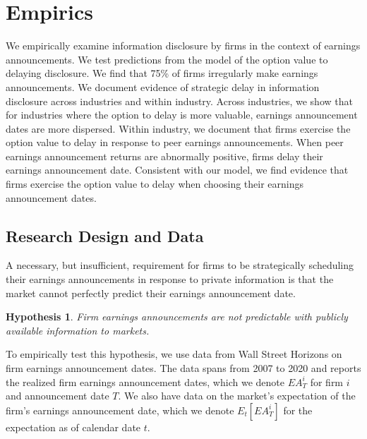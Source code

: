 \documentclass[ecta,nameyear,draft]{econsocart}
\theoremstyle{theorem}
\newtheorem{hypothesis}{Hypothesis}
\numberwithin{lemma}{section}
\numberwithin{proposition}{section}
\numberwithin{equation}{section}
\numberwithin{figure}{section}
\begin{document}
\section{Empirics}

We empirically examine information disclosure by firms in the context of earnings announcements. We test predictions from the model of the option value to delaying disclosure. We find that 75\% of firms irregularly make earnings announcements. We document evidence of strategic delay in information disclosure across industries and within industry. Across industries, we show that for industries where the option to delay is more valuable, earnings announcement dates are more dispersed. Within industry, we document that firms exercise the option value to delay in response to peer earnings announcements. When peer earnings announcement returns are abnormally positive, firms delay their earnings announcement date. Consistent with our model, we find evidence that firms exercise the option value to delay when choosing their earnings announcement dates. 

\subsection{Research Design and Data}\label{ss:researchdesign}

A necessary, but insufficient, requirement for firms to be strategically scheduling their earnings announcements in response to private information is that the market cannot perfectly predict their earnings announcement date. 

\begin{hypothesis}\label{hyp:surprisingdates}
Firm earnings announcements are not predictable with publicly available information to markets. 
\end{hypothesis}
To empirically test this hypothesis, we use data from Wall Street Horizons on firm earnings announcement dates. The data spans from 2007 to 2020 and reports the realized firm earnings announcement dates, which we denote $EA^{i}_{T}$ for firm $i$ and announcement date $T$. We also have data on the market's expectation of the firm's earnings announcement date, which we denote $E_{t}[EA^{i}_{T}]$ for the expectation as of calendar date $t$.  
\end{document}
